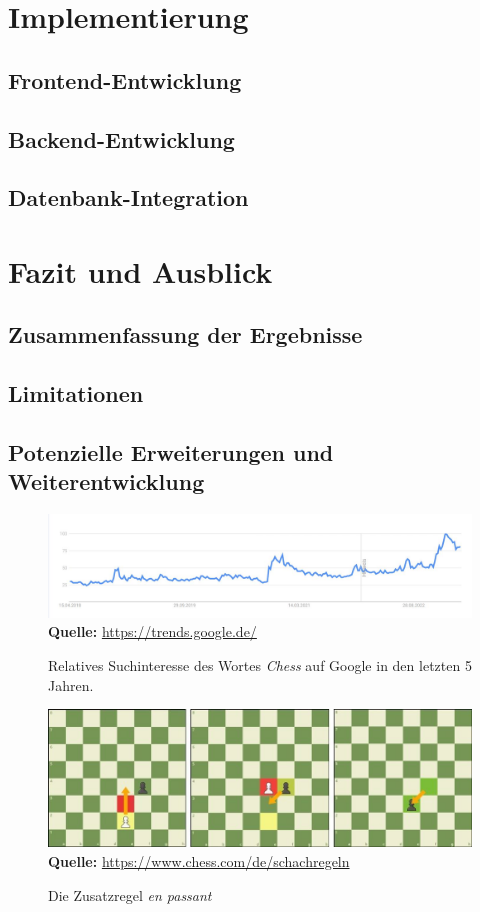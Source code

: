 \documentclass[a4paper,12pt]{report}
\begin{document}
\chapter{Implementierung}
    \section{Frontend-Entwicklung}
    \section{Backend-Entwicklung}
    \section{Datenbank-Integration}

\chapter{Fazit und Ausblick}
    \section{Zusammenfassung der Ergebnisse}
    \section{Limitationen}
    \section{Potenzielle Erweiterungen und Weiterentwicklung}

\appendix

\listoffigures
\begin{figure}[ht]
\raggedleft
  \includegraphics[width=160mm]{Schachentwicklung.jpg}
    \footnotesize\sffamily\textbf{Quelle:} \url{https://trends.google.de/}
  \caption{Relatives Suchinteresse des Wortes \textit{Chess} auf Google in den letzten 5 Jahren.}
  \label{fig:Schachinteresse}
\end{figure}
  
  \begin{figure}[ht]
\raggedleft
  \includegraphics[width=160mm]{en-passant.jpeg}
    \footnotesize\sffamily\textbf{Quelle:} \url{https://www.chess.com/de/schachregeln}
  \caption{Die Zusatzregel \textit{en passant}}
  \label{fig:en-passant}
\end{figure}
\end{document}
